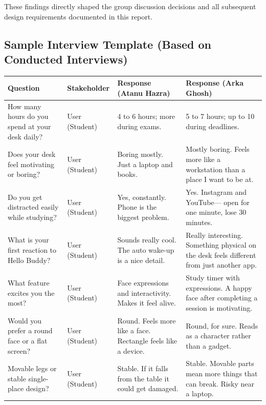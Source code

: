 \documentclass[12pt,a4paper]{article}
\begin{document}
These findings directly shaped the group discussion decisions and all
subsequent design requirements documented in this report.

\subsection*{Sample Interview Template (Based on Conducted Interviews)}

\begin{center}
\scriptsize
\begin{tabular}{|L{0.28\textwidth}|L{0.14\textwidth}|L{0.24\textwidth}|L{0.24\textwidth}|}
\hline
\textbf{Question} & \textbf{Stakeholder} &
\textbf{Response (Atanu Hazra)} &
\textbf{Response (Arka Ghosh)} \\ \hline
How many hours do you spend at your desk daily? &
User (Student) &
4 to 6 hours; more during exams. &
5 to 7 hours; up to 10 during deadlines. \\ \hline
Does your desk feel motivating or boring? &
User (Student) &
Boring mostly. Just a laptop and books. &
Mostly boring. Feels more like a workstation
than a place I want to be at. \\ \hline
Do you get distracted easily while studying? &
User (Student) &
Yes, constantly. Phone is the biggest problem. &
Yes. Instagram and YouTube--- open for one minute,
lose 30 minutes. \\ \hline
What is your first reaction to Hello Buddy? &
User (Student) &
Sounds really cool. The auto wake-up is a
nice detail. &
Really interesting. Something physical on the
desk feels different from just another app. \\ \hline
What feature excites you the most? &
User (Student) &
Face expressions and interactivity. Makes it
feel alive. &
Study timer with expressions. A happy face after
completing a session is motivating. \\ \hline
Would you prefer a round face or a flat screen? &
User (Student) &
Round. Feels more like a face. Rectangle
feels like a device. &
Round, for sure. Reads as a character rather
than a gadget. \\ \hline
Movable legs or stable single-place design? &
User (Student) &
Stable. If it falls from the table it could
get damaged. &
Stable. Movable parts mean more things that can
break. Risky near a laptop. \\ \hline

\end{tabular}
\end{center}
\end{document}
